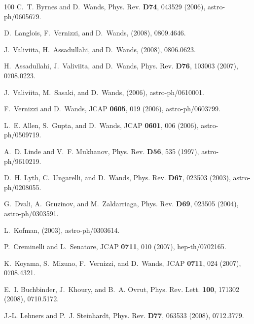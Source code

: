 \documentclass[12pt,letterpaper,rotate]{article}
\begin{document}
{\begin{thebibliography}{100}
C.~T. Byrnes and D.~Wands,
\newblock Phys. Rev. {\bf D74}, 043529 (2006), astro-ph/0605679.

D.~Langlois, F.~Vernizzi, and D.~Wands,
\newblock (2008), 0809.4646.

J.~Valiviita, H.~Assadullahi, and D.~Wands,
\newblock (2008), 0806.0623.

H.~Assadullahi, J.~Valiviita, and D.~Wands,
\newblock Phys. Rev. {\bf D76}, 103003 (2007), 0708.0223.

J.~Valiviita, M.~Sasaki, and D.~Wands,
\newblock (2006), astro-ph/0610001.

F.~Vernizzi and D.~Wands,
\newblock JCAP {\bf 0605}, 019 (2006), astro-ph/0603799.

L.~E. Allen, S.~Gupta, and D.~Wands,
\newblock JCAP {\bf 0601}, 006 (2006), astro-ph/0509719.

A.~D. Linde and V.~F. Mukhanov,
\newblock Phys. Rev. {\bf D56}, 535 (1997), astro-ph/9610219.

D.~H. Lyth, C.~Ungarelli, and D.~Wands,
\newblock Phys. Rev. {\bf D67}, 023503 (2003), astro-ph/0208055.

G.~Dvali, A.~Gruzinov, and M.~Zaldarriaga,
\newblock Phys. Rev. {\bf D69}, 023505 (2004), astro-ph/0303591.

L.~Kofman,
\newblock (2003), astro-ph/0303614.

P.~Creminelli and L.~Senatore,
\newblock JCAP {\bf 0711}, 010 (2007), hep-th/0702165.

K.~Koyama, S.~Mizuno, F.~Vernizzi, and D.~Wands,
\newblock JCAP {\bf 0711}, 024 (2007), 0708.4321.

E.~I. Buchbinder, J.~Khoury, and B.~A. Ovrut,
\newblock Phys. Rev. Lett. {\bf 100}, 171302 (2008), 0710.5172.

J.-L. Lehners and P.~J. Steinhardt,
\newblock Phys. Rev. {\bf D77}, 063533 (2008), 0712.3779.


\end{thebibliography}}
\end{document}
